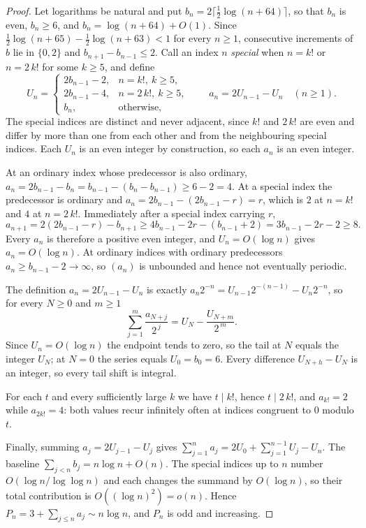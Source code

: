 \documentclass[11pt]{article}
\begin{document}
\begin{proof}
Let logarithms be natural and put $b_n=2\lceil\tfrac12\log(n+64)\rceil$, so
that $b_n$ is even, $b_n\ge6$, and $b_n=\log(n+64)+O(1)$.  Since
$\tfrac12\log(n+65)-\tfrac12\log(n+63)<1$ for every $n\ge1$, consecutive
increments of $b$ lie in $\{0,2\}$ and $b_{n+1}-b_{n-1}\le2$.  Call an index
$n$ \emph{special} when $n=k!$ or $n=2\,k!$ for some $k\ge5$, and define
\[
 U_n=\begin{cases}
  2b_{n-1}-2,& n=k!,\ k\ge5,\\
  2b_{n-1}-4,& n=2\,k!,\ k\ge5,\\
  b_n,&\text{otherwise},
 \end{cases}
 \qquad a_n=2U_{n-1}-U_n\quad(n\ge1).
\]
The special indices are distinct and never adjacent, since $k!$ and $2\,k!$ are
even and differ by more than one from each other and from the neighbouring
special indices.  Each $U_n$ is an even integer by construction, so
each $a_n$ is an even integer.

At an ordinary index whose predecessor is also ordinary,
$a_n=2b_{n-1}-b_n=b_{n-1}-(b_n-b_{n-1})\ge6-2=4$.  At a special index the
predecessor is ordinary and $a_n=2b_{n-1}-(2b_{n-1}-r)=r$, which is $2$ at
$n=k!$ and $4$ at $n=2\,k!$.  Immediately after a special index carrying $r$,
\[
 a_{n+1}=2(2b_{n-1}-r)-b_{n+1}\ge4b_{n-1}-2r-(b_{n-1}+2)
 =3b_{n-1}-2r-2\ge8 .
\]
Every $a_n$ is therefore a positive even integer, and $U_n=O(\log n)$ gives
$a_n=O(\log n)$.  At ordinary indices with ordinary predecessors
$a_n\ge b_{n-1}-2\to\infty$, so $(a_n)$ is unbounded and hence not eventually
periodic.

The definition $a_n=2U_{n-1}-U_n$ is exactly $a_n2^{-n}=U_{n-1}2^{-(n-1)}-U_n2^{-n}$,
so for every $N\ge0$ and $m\ge1$
\[
 \sum_{j=1}^{m}\frac{a_{N+j}}{2^{\,j}}=U_N-\frac{U_{N+m}}{2^{\,m}} .
\]
Since $U_n=O(\log n)$ the endpoint tends to zero, so the tail at $N$ equals the
integer $U_N$; at $N=0$ the series equals $U_0=b_0=6$.  Every difference
$U_{N+h}-U_N$ is an integer, so every tail shift is integral.

For each $t$ and every sufficiently large $k$ we have $t\mid k!$, hence
$t\mid2\,k!$, and $a_{k!}=2$ while $a_{2k!}=4$: both values recur infinitely
often at indices congruent to $0$ modulo $t$.

Finally, summing $a_j=2U_{j-1}-U_j$ gives
$\sum_{j=1}^{n}a_j=2U_0+\sum_{j=1}^{n-1}U_j-U_n$.  The baseline
$\sum_{j<n}b_j=n\log n+O(n)$.  The special indices up to $n$ number
$O(\log n/\log\log n)$ and each changes the summand by $O(\log n)$, so their
total contribution is $O((\log n)^2)=o(n)$.  Hence
$P_n=3+\sum_{j\le n}a_j\sim n\log n$, and $P_n$ is odd and increasing.
\end{proof}
\end{document}
